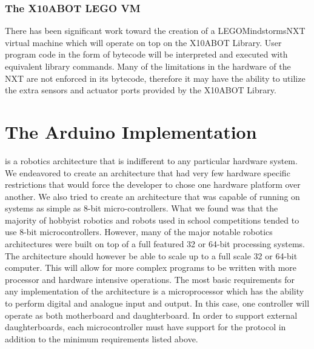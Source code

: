 	\subsubsection{The X10ABOT LEGO VM} %
	\label{ssub:the_x10abot_lego_vm}
	There has been significant work toward the creation of a LEGO\textregistered Mindstorms\textregistered NXT virtual machine which will operate on top on the X10ABOT Library. User program code in the form of bytecode will be interpreted and executed with equivalent library commands. Many of the limitations in the hardware of the NXT are not enforced in its bytecode, therefore it may have the ability to utilize the extra sensors and actuator ports provided by the X10ABOT Library.
	


\section{The Arduino Implementation} %
\label{sec:the_arduino_implementation}
\xten is a robotics architecture that is indifferent to any particular hardware system. We endeavored to create an architecture that had very few hardware specific restrictions that would force the developer to chose one hardware platform over another. We also tried to create an architecture that was capable of running on systems as simple as 8-bit micro-controllers. What we found was that the majority of hobbyist robotics and robots used in school competitions tended to use 8-bit microcontrollers. However, many of the major notable robotics architectures were built on top of a full featured 32 or 64-bit processing systems\parencite{Elkady2012}. The architecture should however be able to scale up to a full scale 32 or 64-bit computer. This will allow for more complex programs to be written with more processor and hardware intensive operations. The most basic requirements for any implementation of the \xten architecture is a microprocessor which has the ability to perform digital and analogue input and output. In this case, one controller will operate as both motherboard and daughterboard. In order to support external daughterboards, each microcontroller must have support for the \iic protocol in addition to the minimum requirements listed above.

